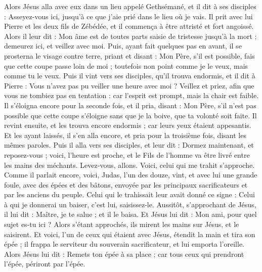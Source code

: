 \begin{multicols}{2}
Alors Jésus alla avec eux dans un lieu appelé Gethsémané, et il dit à ses disciples : Asseyez-vous ici, jusqu'à ce que j'aie prié dans le lieu où je vais.
Il prit avec lui Pierre et les deux fils de Zébédée, et il commença à être attristé et fort angoissé.
Alors il leur dit : Mon âme est de toutes parts saisie de tristesse jusqu'à la mort ; demeurez ici, et veillez avec moi.
Puis, ayant fait quelques pas en avant, il se prosterna le visage contre terre, priant et disant : Mon Père, s'il est possible, fais que cette coupe passe loin de moi ; toutefois non point comme je le veux, mais comme tu le veux.
Puis il vint vers ses disciples, qu'il trouva endormis, et il dit à Pierre : Vous n'avez pas pu veiller une heure avec moi ?
Veillez et priez, afin que vous ne tombiez pas en tentation : car l'esprit est prompt, mais la chair est faible.
Il s'éloigna encore pour la seconde fois, et il pria, disant : Mon Père, s'il n'est pas possible que cette coupe s'éloigne sans que je la boive, que ta volonté soit faite.
Il revint ensuite, et les trouva encore endormis ; car leurs yeux étaient appesantis.
Et les ayant laissés, il s'en alla encore, et pria pour la troisième fois, disant les mêmes paroles.
Puis il alla vers ses disciples, et leur dit : Dormez maintenant, et reposez-vous ; voici, l'heure est proche, et le Fils de l'homme va être livré entre les mains des méchants.
Levez-vous, allons. Voici, celui qui me trahit s'approche.
Comme il parlait encore, voici, Judas, l'un des douze, vint, et avec lui une grande foule, avec des épées et des bâtons, envoyée par les principaux sacrificateurs et par les anciens du peuple.
Celui qui le trahissait leur avait donné ce signe : Celui à qui je donnerai un baiser, c'est lui, saisissez-le.
Aussitôt, s'approchant de Jésus, il lui dit : Maître, je te salue ; et il le baisa.
Et Jésus lui dit : Mon ami, pour quel sujet es-tu ici ? Alors s'étant approchés, ils mirent les mains sur Jésus, et le saisirent.
Et voici, l'un de ceux qui étaient avec Jésus, étendit la main et tira son épée ; il frappa le serviteur du souverain sacrificateur, et lui emporta l'oreille.
Alors Jésus lui dit : Remets ton épée à sa place ; car tous ceux qui prendront l'épée, périront par l'épée.

\end{multicols}
